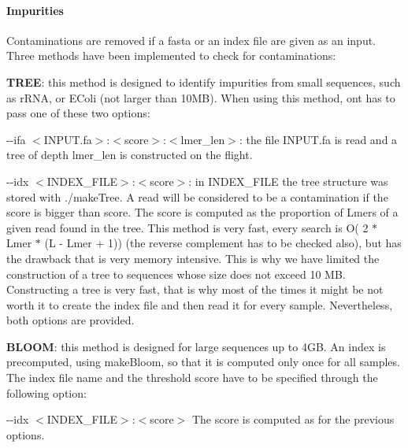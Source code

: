 \paragraph*{Impurities}

Contaminations are removed if a fasta or an index file are given as an input. Three methods have been implemented to check for contaminations\+:


\begin{DoxyItemize}
\item {\bfseries T\+R\+EE}\+: this method is designed to identify impurities from small sequences, such as r\+R\+NA, or E\+Coli (not larger than 10\+MB). When using this method, ont has to pass one of these two options\+:
\begin{DoxyItemize}
\item {\ttfamily -\/-\/ifa $<$I\+N\+P\+U\+T.\+fa$>$\+:$<$score$>$\+:$<$lmer\+\_\+len$>$}\+: the file {\ttfamily I\+N\+P\+U\+T.\+fa} is read and a tree of depth {\ttfamily lmer\+\_\+len} is constructed on the flight.
\item {\ttfamily -\/-\/idx $<$I\+N\+D\+E\+X\+\_\+\+F\+I\+LE$>$\+:$<$score$>$}\+: in {\ttfamily I\+N\+D\+E\+X\+\_\+\+F\+I\+LE} the tree structure was stored with {\ttfamily ./make\+Tree}. A read will be considered to be a contamination if the score is bigger than {\ttfamily score}. The score is computed as the proportion of Lmers of a given read found in the tree. This method is very fast, every search is {\ttfamily O( 2 $\ast$ Lmer $\ast$ (L -\/ Lmer + 1))} (the reverse complement has to be checked also), but has the drawback that is very memory intensive. This is why we have limited the construction of a tree to sequences whose size does not exceed 10 MB. Constructing a tree is very fast, that is why most of the times it might be not worth it to create the index file and then read it for every sample. Nevertheless, both options are provided.
\end{DoxyItemize}
\item {\bfseries B\+L\+O\+OM}\+: this method is designed for large sequences up to 4\+GB. An index is precomputed, using {\ttfamily make\+Bloom}, so that it is computed only once for all samples. The index file name and the threshold score have to be specified through the following option\+:
\begin{DoxyItemize}
\item {\ttfamily -\/-\/idx $<$I\+N\+D\+E\+X\+\_\+\+F\+I\+LE$>$\+:$<$score$>$} The score is computed as for the previous options.
\end{DoxyItemize}
\end{DoxyItemize}

